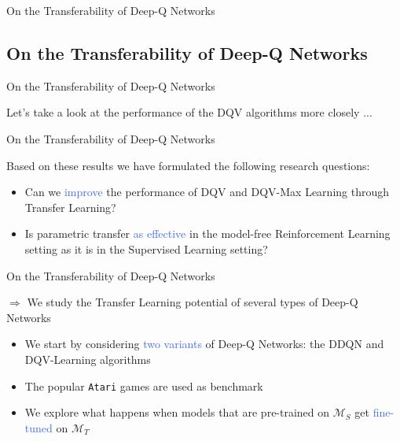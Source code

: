 \documentclass{beamer}
\begin{document}
\begin{frame}{On the Transferability of Deep-Q Networks}
	\subsection{On the Transferability of Deep-Q Networks}

\end{frame}

\begin{frame}{On the Transferability of Deep-Q Networks}
	
	Let's take a look at the performance of the DQV algorithms more closely ...
	
	\bigskip
	

\end{frame}


\begin{frame}{On the Transferability of Deep-Q Networks}

	Based on these results we have formulated the following research questions:

	\begin{itemize}
		\item Can we \textcolor{RoyalBlue}{improve} the performance of DQV and DQV-Max Learning through Transfer Learning?
		\item Is parametric transfer \textcolor{RoyalBlue}{as effective} in the model-free Reinforcement Learning setting as it is in the Supervised Learning setting?
	\end{itemize}
	
\end{frame}

\begin{frame}{On the Transferability of Deep-Q Networks}

	$\Rightarrow$ We study the Transfer Learning potential of several types of Deep-Q Networks
	
	\bigskip
	\begin{itemize}
		\item We start by considering \textcolor{RoyalBlue}{two variants} of Deep-Q Networks: the DDQN and DQV-Learning algorithms
		\item The popular \texttt{Atari} games are used as benchmark
		\item We explore what happens when models that are pre-trained on $\mathcal{M}_S$ get \textcolor{RoyalBlue}{fine-tuned} on $\mathcal{M}_T$
	\end{itemize}

\end{frame}
\end{document}
